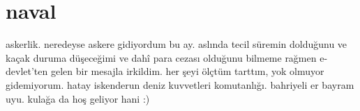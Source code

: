 \documentclass[a4paper, twocolumn, openright]{memoir}
\begin{document}
\section{naval}
askerlik. neredeyse askere gidiyordum bu ay. aslında tecil süremin
dolduğunu ve kaçak duruma düşeceğimi ve dahî para cezası olduğunu bilmeme
rağmen e-devlet’ten gelen bir mesajla irkildim. her şeyi ölçtüm tarttım,
yok olmuyor gidemiyorum. hatay iskenderun deniz kuvvetleri komutanlığı.
bahriyeli er bayram uyu. kulağa da hoş geliyor hani :)
\end{document}

